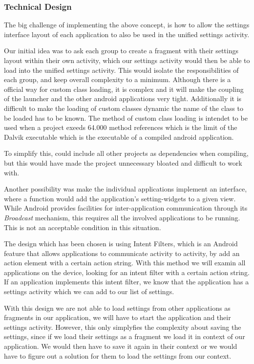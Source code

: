 \subsubsection{Technical Design}
The big challenge of implementing the above concept, is how to allow the settings interface layout of each application to also be used in the unified settings activity. 

Our initial idea was to ask each group to create a fragment with their settings layout within their own activity, which our settings activity would then be able to load into the unified settings activity. This would isolate the responsibilities of each group, and keep overall complexity to a minimum. Although there is a official way for custom class loading\citet{customClassLoading}, it is complex and it will make the coupling of the launcher and the other android applications very tight. Additionally it is difficult to make the loading of custom classes dynamic the name of the class to be loaded has to be known. The method of custom class loading is intendet to be used when a project exeeds 64.000 method references which is the limit of the Dalvik executable which is the executable of a compiled android application.

To simplify this, \launcher could include all other projects as dependencies when compiling, but this would have made the \launcher project unnecessary bloated and difficult to work with.

Another possibility was make the individual applications implement an interface, where a function would add the application's setting-widgets to a given view. While Android provides facilities for inter-application communication through its \textit{Broadcast} mechanism\cite{broadcastReceiver}, this requires all the involved applications to be running. This is not an acceptable condition in this situation. 

The design which has been chosen is using Intent Filters\cite{intentFilter}, which is an Android feature that allows applications to communicate activity to activity, by add an action element with a certain action string.
With this method we will examin all applications on the device, looking for an intent filter with a certain action string.
If an application implements this intent filter, we know that the application has a settings activity which we can add to our list of settings.

With this design we are not able to load settings from other applications as fragments in our application, we will have to start the application and their settings activity. However, this only simplyfies the complexity about saving the settings, since if we load their settings as a fragment we load it in context of our application. We would then have to save it again in their context or we would have to figure out a solution for them to load the settings from our context.

